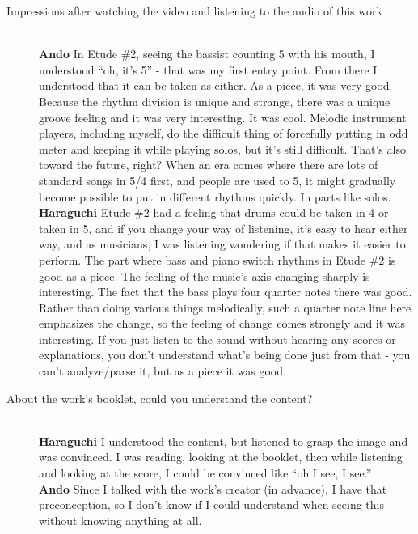 \begin{description}
\item[Impressions after watching the video and listening to the audio of this work]\mbox{}\\

{\bf Ando} In Etude \#2, seeing the bassist counting 5 with his mouth, I understood ``oh, it's 5'' - that was my first entry point. From there I understood that it can be taken as either. As a piece, it was very good. Because the rhythm division is unique and strange, there was a unique groove feeling and it was very interesting. It was cool. Melodic instrument players, including myself, do the difficult thing of forcefully putting in odd meter and keeping it while playing solos, but it's still difficult. That's also toward the future, right? When an era comes where there are lots of standard songs in 5/4 first, and people are used to 5, it might gradually become possible to put in different rhythms quickly. In parts like solos.\\

{\bf Haraguchi} Etude \#2 had a feeling that drums could be taken in 4 or taken in 5, and if you change your way of listening, it's easy to hear either way, and as musicians, I was listening wondering if that makes it easier to perform. The part where bass and piano switch rhythms in Etude \#2 is good as a piece. The feeling of the music's axis changing sharply is interesting. The fact that the bass plays four quarter notes there was good. Rather than doing various things melodically, such a quarter note line here emphasizes the change, so the feeling of change comes strongly and it was interesting. If you just listen to the sound without hearing any scores or explanations, you don't understand what's being done just from that - you can't analyze/parse it, but as a piece it was good.\\

\item [About the work's booklet, could you understand the content?]\mbox{}\\

{\bf Haraguchi} I understood the content, but listened to grasp the image and was convinced. I was reading, looking at the booklet, then while listening and looking at the score, I could be convinced like ``oh I see, I see.''\\

{\bf Ando} Since I talked with the work's creator (in advance), I have that preconception, so I don't know if I could understand when seeing this without knowing anything at all.\\


\end{description}
